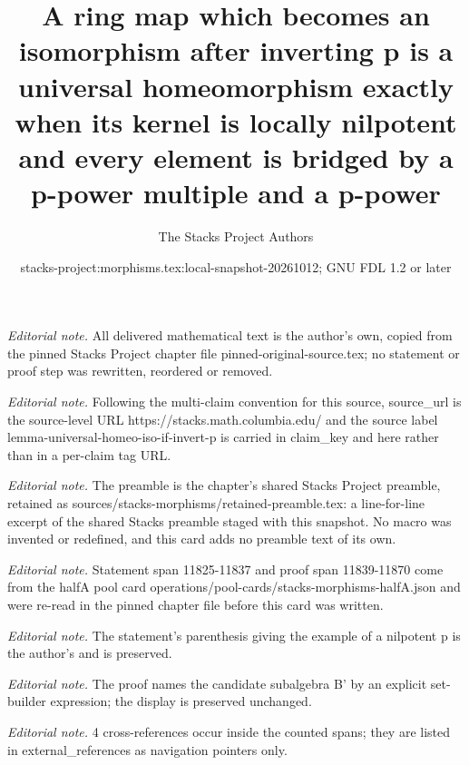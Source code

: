 \documentclass[10pt,a4paper]{amsart}
\title{A ring map which becomes an isomorphism after inverting p is a universal homeomorphism exactly when its kernel is locally nilpotent and every element is bridged by a p-power multiple and a p-power}
\author{The Stacks Project Authors}
\date{stacks-project:morphisms.tex:local-snapshot-20261012; GNU FDL 1.2 or later}
\theoremstyle{plain}
\theoremstyle{definition}
\theoremstyle{remark}
\numberwithin{equation}{subsection}
\begin{document}
\maketitle
\noindent\textit{Editorial note.} All delivered mathematical text is the author's own, copied from the pinned Stacks Project chapter file pinned-original-source.tex; no statement or proof step was rewritten, reordered or removed.\par\medskip
\noindent\textit{Editorial note.} Following the multi-claim convention for this source, source\_url is the source-level URL https://stacks.math.columbia.edu/ and the source label lemma-universal-homeo-iso-if-invert-p is carried in claim\_key and here rather than in a per-claim tag URL.\par\medskip
\noindent\textit{Editorial note.} The preamble is the chapter's shared Stacks Project preamble, retained as sources/stacks-morphisms/retained-preamble.tex: a line-for-line excerpt of the shared Stacks preamble staged with this snapshot. No macro was invented or redefined, and this card adds no preamble text of its own.\par\medskip
\noindent\textit{Editorial note.} Statement span 11825-11837 and proof span 11839-11870 come from the halfA pool card operations/pool-cards/stacks-morphisms-halfA.json and were re-read in the pinned chapter file before this card was written.\par\medskip
\noindent\textit{Editorial note.} The statement's parenthesis giving the example of a nilpotent p is the author's and is preserved.\par\medskip
\noindent\textit{Editorial note.} The proof names the candidate subalgebra B' by an explicit set-builder expression; the display is preserved unchanged.\par\medskip
\noindent\textit{Editorial note.} 4 cross-references occur inside the counted spans; they are listed in external\_references as navigation pointers only.\par\medskip
\end{document}
